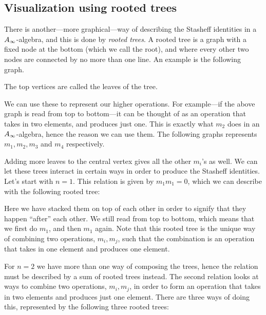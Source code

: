 
\subsection{Visualization using rooted trees}
\label{ssec:trees}


There is another---more graphical---way of describing the Stasheff identities in a $A_{\infty}$-algebra, and this is done by \emph{rooted trees}. A rooted tree is a graph with a fixed node at the bottom (which we call the root), and where every other two nodes are connected by no more than one line. An example is the following graph.



The top vertices are called the leaves of the tree. 

We can use these to represent our higher operations. For example---if the above graph is read from top to bottom---it can be thought of as an operation that takes in two elements, and produces just one. This is exactly what $m_2$ does in an $A_{\infty}$-algebra, hence the reason we can use them. The following graphs represents $m_1, m_2, m_3$ and $m_4$ respectively. 



Adding more leaves to the central vertex gives all the other $m_i$'s as well. We can let these trees interact in certain ways in order to produce the Stasheff identities. Let's start with $n=1$. This relation is given by $m_1 m_1=0$, which we can describe with the following rooted tree:


Here we have stacked them on top of each other in order to signify that they happen ``after'' each other. We still read from top to bottom, which means that we first do $m_1$, and then $m_1$ again. Note that this rooted tree is the unique way of combining two operations, $m_i, m_j$, such that the combination is an operation that takes in one element and produces one element. 

For $n=2$ we have more than one way of composing the trees, hence the relation must be described by a sum of rooted trees instead. The second relation looks at ways to combine two operations, $m_i, m_j$, in order to form an operation that takes in two elements and produces just one element. There are three ways of doing this, represented by the following three rooted trees:


